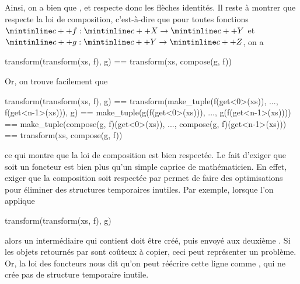 Ainsi, on a bien que , et  respecte
donc les flèches identités. Il reste à montrer que  respecte la
loi de composition, c'est-à-dire que pour toutes fonctions $\cc{f} : \cc{X} \to \cc{Y}$
et $\cc{g} : \cc{Y} \to \cc{Z}$, on a
\begin{cpp}
    transform(transform(xs, f), g) == transform(xs, compose(g, f))
\end{cpp}

Or, on trouve facilement que
\begin{cpp}
    transform(transform(xs, f), g)
        == transform(make_tuple(f(get<0>(xs)), ..., f(get<n-1>(xs))), g)
        == make_tuple(g(f(get<0>(xs))), ..., g(f(get<n-1>(xs))))
        == make_tuple(compose(g, f)(get<0>(xs)), ..., compose(g, f)(get<n-1>(xs)))
        == transform(xs, compose(g, f))
\end{cpp}

ce qui montre que la loi de composition est bien respectée. Le fait d'exiger
que  soit un foncteur est bien plus qu'un simple caprice de
mathématicien. En effet, exiger que la composition soit respectée par
 permet de faire des optimisations pour éliminer des
structures temporaires inutiles. Par exemple, lorsque l'on applique
\begin{cpp}
    transform(transform(xs, f), g)
\end{cpp}

alors un  intermédiaire qui contient  doit
être créé, puis envoyé aux deuxième . Si les objets retournés
par  sont coûteux à copier, ceci peut représenter un problème. Or, la
loi des foncteurs nous dit qu'on peut réécrire cette ligne comme
, qui ne crée pas de structure
temporaire inutile.




